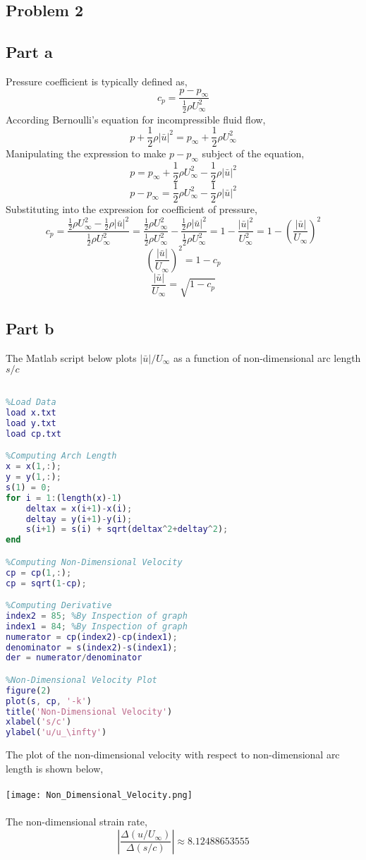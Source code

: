 \documentclass[a4paper, 12pt]{report}
\def\f{\frac}
\def\l{\left}
\def\r{\right}
\def\dst{\displaystyle}
\def\b{\bar}
\def\size{0.90}
\let\stdsection\section
\renewcommand\section{\newpage\stdsection}
\begin{document}
\begin{center}
\section{Problem 2}
\begin{comment}
\end{comment}
\subsection{Part a}
Pressure coefficient is typically defined as,
$$c_p = \f{p-p_\infty}{\dst{\f{1}{2}\rho U_\infty^2}}$$
According Bernoulli's equation for incompressible fluid flow,
$$p + \f{1}{2}\rho |\b{u}|^2 = p_\infty + \f{1}{2}\rho U_\infty^2$$
Manipulating the expression to make $p-p_\infty$ subject of the equation,
$$p = p_\infty + \f{1}{2}\rho U_\infty^2 - \f{1}{2}\rho |\b{u}|^2$$
$$p - p_\infty =  \f{1}{2}\rho U_\infty^2 - \f{1}{2}\rho |\b{u}|^2$$
Substituting into the expression for coefficient of pressure,
$$c_p = \f{\dst{\f{1}{2}\rho U_\infty^2 - \f{1}{2}\rho |\b{u}|^2}}{\dst{\f{1}{2}\rho U_\infty^2}} = \f{\dst{\f{1}{2}\rho U_\infty^2}}{\dst{\f{1}{2}\rho U_\infty^2}} - \f{\dst{\f{1}{2}\rho |\b{u}|^2}}{\dst{\f{1}{2}\rho U_\infty^2}} = 1 - \f{\dst{ |\b{u}|^2}}{\dst{ U_\infty^2}} = 1 - \l(\f{\dst{ |\b{u}|}}{\dst{ U_\infty}}\r)^2$$
$$\l(\f{\dst{ |\b{u}|}}{\dst{ U_\infty}}\r)^2 = 1 - c_p$$
$$\f{\dst{ |\b{u}|}}{\dst{ U_\infty}} = \sqrt{\dst{1 - c_p}}$$
\subsection{Part b}
The Matlab script below plots $\dst{|\b{u}|/U_\infty}$ as a function of non-dimensional arc length $s/c$
\begin{lstlisting}[language=Matlab]
%Author: Hans C. Suganda

%Load Data
load x.txt
load y.txt
load cp.txt

%Computing Arch Length
x = x(1,:);
y = y(1,:);
s(1) = 0;
for i = 1:(length(x)-1)
    deltax = x(i+1)-x(i);
    deltay = y(i+1)-y(i);
    s(i+1) = s(i) + sqrt(deltax^2+deltay^2);
end

%Computing Non-Dimensional Velocity
cp = cp(1,:);
cp = sqrt(1-cp);

%Computing Derivative
index2 = 85; %By Inspection of graph
index1 = 84; %By Inspection of graph
numerator = cp(index2)-cp(index1);
denominator = s(index2)-s(index1);
der = numerator/denominator

%Non-Dimensional Velocity Plot
figure(2)
plot(s, cp, '-k')
title('Non-Dimensional Velocity')
xlabel('s/c')
ylabel('u/u_\infty')
\end{lstlisting}
$$$$
The plot of the non-dimensional velocity with respect to non-dimensional arc length is shown below,
\\~\\\texttt{[image: Non\_Dimensional\_Velocity.png]}
\\~\\The non-dimensional strain rate,
$$\l|\f{\Delta(u/U_\infty)}{\Delta(s/c)}\r| \approx 8.12488653555$$

\end{center}
\end{document}
